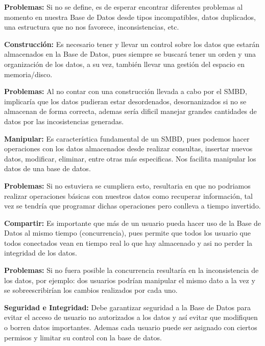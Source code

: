 \documentclass[12pt]{report}
\begin{document}
\begin{enumerate}[label=\textbf{\arabic*.}, leftmargin=*]
\begin{enumerate}[label=\textbf{\alph*.}, leftmargin=*, itemsep=1.0em]
\hspace{0.3cm}\textbf{Problemas:} Si no se define, es de esperar encontrar diferentes problemas al momento en nuestra Base de Datos desde tipos incompatibles, datos duplicados, una estructura que no nos favorece, inconsistencias, etc.


\textbf{Construcción:}
Es necesario tener y llevar un control sobre los datos que estarán almacenados en la Base de Datos, pues siempre se buscará tener un orden y una organización de los datos, a su vez, también llevar una gestión del espacio en memoria/disco.

\hspace{0.3cm}\textbf{Problemas:}
Al no contar con una construcción llevada a cabo por el SMBD, implicaría que los datos pudieran estar desordenados, desornanizados si no se almacenan de forma correcta, ademas sería dificil manejar grandes cantidades de datos por las incosistencias generadas.


\textbf{Manipular:}
Es característica fundamental de un SMBD, pues podemos hacer operaciones con los datos almacenados desde realizar consultas, insertar nuevos datos, modificar, eliminar, entre otras más especificas. Nos facilita manipular los datos de una base de datos.

\hspace{0.3cm}\textbf{Problemas:}
Si no estuviera se cumpliera esto, resultaria en que no podriamos realizar operaciones básicas con nuestros datos como recuperar información, tal vez se tendría que programar dichas operaciones pero conlleva a tiempo invertido.


\textbf{Compartir:}
Es importante que más de un usuario pueda hacer uso de la Base de Datos al mismo tiempo (concurrencia), pues permite que todos los usuario que todos conectados vean en tiempo real lo que hay almacenado y asi no perder la integridad de los datos.

\hspace{0.3cm}\textbf{Problemas:}
Si no fuera posible la concurrencia resultaría en la inconsistencia de los datos, por ejemplo: dos usuarios podrían manipular el mismo dato a la vez y se sobreescribirían los cambios realizados por cada uno.

\textbf{Seguridad e Integridad:}
Debe garantizar seguridad a la Base de Datos para evitar el acceso de usuario no autorizados a los datos y así evitar que modifiquen o borren datos importantes. Ademas cada usuario puede ser asignado con ciertos permisos y limitar su control con la base de datos.


\end{enumerate}
\end{enumerate}
\end{document}
